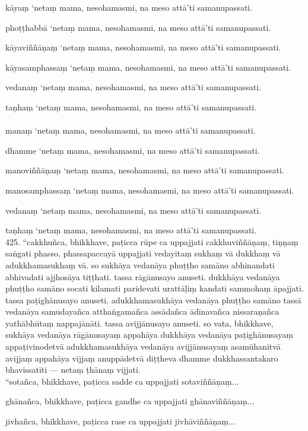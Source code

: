\documentclass[10pt]{article}
\begin{document}
kāyaṃ ‘netaṃ mama, nesohamasmi, na meso attā’ti samanupassati.\

phoṭṭhabbā ‘netaṃ mama, nesohamasmi, na meso attā’ti samanupassati.\

kāyaviññāṇaṃ ‘netaṃ mama, nesohamasmi, na meso attā’ti samanupassati.\

kāyasamphassaṃ ‘netaṃ mama, nesohamasmi, na meso attā’ti samanupassati.\

vedanaṃ ‘netaṃ mama, nesohamasmi, na meso attā’ti samanupassati.\

taṇhaṃ ‘netaṃ mama, nesohamasmi, na meso attā’ti samanupassati.\\
\pagebreak\\

manaṃ ‘netaṃ mama, nesohamasmi, na meso attā’ti samanupassati.\

dhamme ‘netaṃ mama, nesohamasmi, na meso attā’ti samanupassati.\

manoviññāṇaṃ ‘netaṃ mama, nesohamasmi, na meso attā’ti samanupassati.\

manosamphassaṃ ‘netaṃ mama, nesohamasmi, na meso attā’ti samanupassati.\

vedanaṃ ‘netaṃ mama, nesohamasmi, na meso attā’ti samanupassati.\

taṇhaṃ ‘netaṃ mama, nesohamasmi, na meso attā’ti samanupassati.\\

425. “cakkhuñca, bhikkhave, paṭicca rūpe ca uppajjati cakkhuviññāṇaṃ, tiṇṇaṃ saṅgati phasso, phassapaccayā uppajjati vedayitaṃ sukhaṃ vā dukkhaṃ vā adukkhamasukhaṃ vā. so sukhāya vedanāya phuṭṭho samāno abhinandati abhivadati ajjhosāya tiṭṭhati. tassa rāgānusayo anuseti. dukkhāya vedanāya phuṭṭho samāno socati kilamati paridevati urattāḷiṃ kandati sammohaṃ āpajjati. tassa paṭighānusayo anuseti. adukkhamasukhāya vedanāya phuṭṭho samāno tassā vedanāya samudayañca atthaṅgamañca assādañca ādīnavañca nissaraṇañca yathābhūtaṃ nappajānāti. tassa avijjānusayo anuseti. so vata, bhikkhave, sukhāya vedanāya rāgānusayaṃ appahāya dukkhāya vedanāya paṭighānusayaṃ appaṭivinodetvā adukkhamasukhāya vedanāya avijjānusayaṃ asamūhanitvā avijjaṃ appahāya vijjaṃ anuppādetvā diṭṭheva dhamme dukkhassantakaro bhavissatīti — netaṃ ṭhānaṃ vijjati.\\

“sotañca, bhikkhave, paṭicca sadde ca uppajjati sotaviññāṇaṃ...\

ghānañca, bhikkhave, paṭicca gandhe ca uppajjati ghānaviññāṇaṃ...\

jivhañca, bhikkhave, paṭicca rase ca uppajjati jivhāviññāṇaṃ...\
\end{document}
